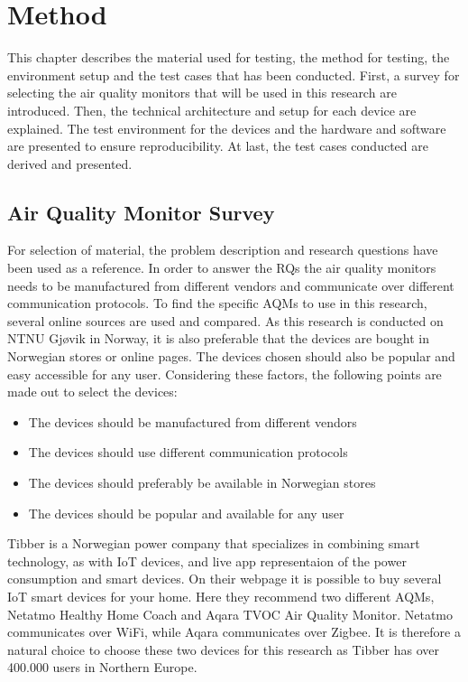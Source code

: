 \chapter*{Method}
This chapter describes the material used for testing, the method for testing, the environment setup and the test cases that has been conducted. First, a survey for selecting the air quality monitors that will be used in this research are introduced. Then, the technical architecture and setup for each device are explained. The test environment for the devices and the hardware and software are presented to ensure reproducibility. At last, the test cases conducted are derived and presented. 
\section*{Air Quality Monitor Survey}
For selection of material, the problem description and research questions have been used as a reference. In order to answer the RQs the air quality monitors needs to be manufactured from different vendors and communicate over different communication protocols. To find the specific AQMs to use in this research, several online sources are used and compared. As this research is conducted on NTNU Gjøvik in Norway, it is also preferable that the devices are bought in Norwegian stores or online pages. The devices chosen should also be popular and easy accessible for any user. Considering these factors, the following points are made out to select the devices:
\begin{itemize}
    \item The devices should be manufactured from different vendors
    \item The devices should use different communication protocols
    \item The devices should preferably be available in Norwegian stores
    \item The devices should be popular and available for any user
\end{itemize}
Tibber \cite{Tibber} is a Norwegian power company that specializes in combining smart technology, as with IoT devices, and live app representaion of the power consumption and smart devices. \cite{Tibber} On their webpage it is possible to buy several IoT smart devices for your home. Here they recommend two different AQMs, Netatmo Healthy Home Coach and Aqara TVOC Air Quality Monitor. Netatmo communicates over WiFi, while Aqara communicates over Zigbee. It is therefore a natural choice to choose these two devices for this research as Tibber has over 400.000 users in Northern Europe. \cite{TibberUsers}
